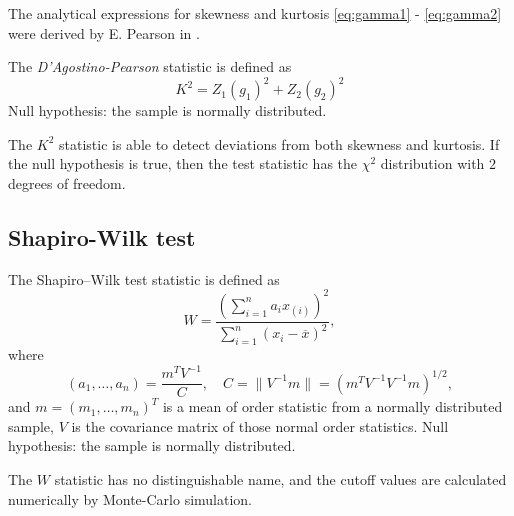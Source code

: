         The analytical expressions for skewness and kurtosis \eqref{eq:gamma1} - \eqref{eq:gamma2} were derived by E. Pearson in \cite{Pearson1931}.
        \begin{definition}
            The \emph{D'Agostino-Pearson} statistic is defined as 
            \begin{equation}
                K^2 = Z_1(g_1)^2 + Z_2(g_2)^2
            \end{equation}
            Null hypothesis: the sample is normally distributed.
        \end{definition}

        \begin{nb}
            The $K^2$ statistic is able to detect deviations from both skewness and kurtosis. 
            If the null hypothesis is true, then the test statistic has the $\chi^2$ 
            distribution with $2$ degrees of freedom. 
        \end{nb}

    \subsection{Shapiro-Wilk test}
        \begin{definition}
            The Shapiro–Wilk test statistic is defined as
            \begin{equation}
                W = \frac{\left(\sum_{i=1}^n a_i x_{(i)}\right)^2}{\sum_{i=1}^n (x_i-\overline{x})^2},
            \end{equation}
            where
            \begin{equation*}
                (a_1, \dots, a_n) = \frac{m^{T} V^{-1}}{C}, \quad C = \| V^{-1} m \| = (m^{T} V^{-1}V^{-1}m)^{1/2},
            \end{equation*}
            and $m = (m_1, \dots, m_n)^{T}$ is a mean of order statistic from a normally distributed sample, $V$ is the covariance matrix of those normal order statistics. 
            Null hypothesis: the sample is normally distributed.
        \end{definition}

        \begin{nb}
            The $W$ statistic has no distinguishable name, and the cutoff values are calculated numerically by Monte-Carlo simulation.
        \end{nb}